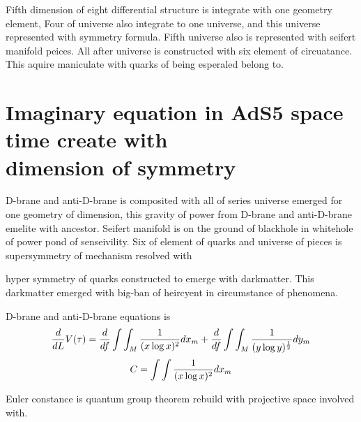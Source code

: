 \documentclass{jsarticle}
\begin{document}
  Fifth dimension of eight differential structure is integrate with one geometry element,
Four of universe also integrate to one universe, and this universe represented with symmetry formula.
Fifth universe also is represented with seifert manifold peices.
All after universe is constructed with six element of circuatance.
This aquire maniculate with quarks of being esperaled belong to.

\section{Imaginary equation in AdS5 space time create with \\
       dimension of symmetry}

  D-brane and anti-D-brane is composited with all of series universe emerged for one geometry of 
dimension, this gravity of power from D-brane and anti-D-brane emelite with ancestor.
Seifert manifold is on the ground of blackhole in whitehole of power pond of senseivility.
Six of element of quarks and universe of pieces is supersymmetry of mechanism resolved with

hyper symmetry of quarks constructed to emerge with darkmatter.
This darkmatter emerged with big-ban of heircyent in circumstance of phenomena.

  D-brane and anti-D-brane equations is
  $$ {d \over dL}V(\tau) = {d \over df}\int \int_M {1 \over (x \log x)^2}dx_m
  + {d \over df}\int \int_M {1 \over (y \log y)^{1 \over 2}}dy_m $$
  $$ C = \int \int {1 \over (x \log x)^2}dx_m $$

  Euler constance is quantum group theorem rebuild with projective space involved with.
\end{document}
